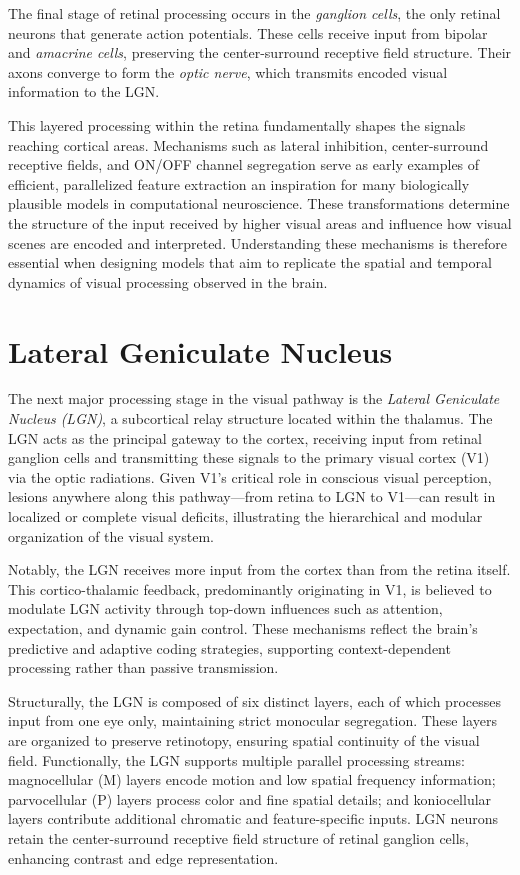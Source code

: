 The final stage of retinal processing occurs in the \emph{ganglion cells}, the only retinal neurons that generate action potentials. These cells receive input from bipolar and \emph{amacrine cells}, preserving the center-surround receptive field structure. Their axons converge to form the \emph{optic nerve}, which transmits encoded visual information to the LGN.

This layered processing within the retina fundamentally shapes the signals reaching cortical areas. Mechanisms such as lateral inhibition, center-surround receptive fields, and ON/OFF channel segregation serve as early examples of efficient, parallelized feature extraction an inspiration for many biologically plausible models in computational neuroscience. These transformations determine the structure of the input received by higher visual areas and influence how visual scenes are encoded and interpreted. Understanding these mechanisms is therefore essential when designing models that aim to replicate the spatial and temporal dynamics of visual processing observed in the brain.

\section{Lateral Geniculate Nucleus}
\label{sec:lgn}
The next major processing stage in the visual pathway is the \emph{Lateral Geniculate Nucleus (LGN)}, a subcortical relay structure located within the thalamus. The LGN acts as the principal gateway to the cortex, receiving input from retinal ganglion cells and transmitting these signals to the primary visual cortex (V1) via the optic radiations. Given V1's critical role in conscious visual perception, lesions anywhere along this pathway—from retina to LGN to V1—can result in localized or complete visual deficits, illustrating the hierarchical and modular organization of the visual system.

Notably, the LGN receives more input from the cortex than from the retina itself. This cortico-thalamic feedback, predominantly originating in V1, is believed to modulate LGN activity through top-down influences such as attention, expectation, and dynamic gain control. These mechanisms reflect the brain's predictive and adaptive coding strategies, supporting context-dependent processing rather than passive transmission.

Structurally, the LGN is composed of six distinct layers, each of which processes input from one eye only, maintaining strict monocular segregation. These layers are organized to preserve retinotopy, ensuring spatial continuity of the visual field. Functionally, the LGN supports multiple parallel processing streams: magnocellular (M) layers encode motion and low spatial frequency information; parvocellular (P) layers process color and fine spatial details; and koniocellular layers contribute additional chromatic and feature-specific inputs. LGN neurons retain the center-surround receptive field structure of retinal ganglion cells, enhancing contrast and edge representation.


